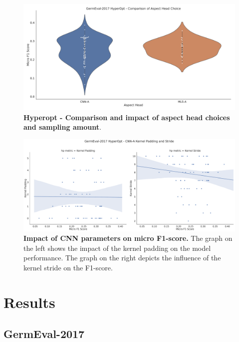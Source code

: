 \begin{figure}[H]
	\centering
	\includegraphics[width=\textwidth]{figures/06_results/06_hp_ge_vio_aspectHead_test}
	\caption{\textbf{Hyperopt - Comparison and impact of aspect head choices and sampling amount}.}
	\label{fig:06_ge_aspectHeadChoices}
\end{figure}

\begin{figure}[H]
	\centering
	\includegraphics[width=\textwidth]{figures/06_results/06_hp_ge_lm_cnnParams2_test}
	\caption{\textbf{Impact of CNN parameters on micro F1-score.} The graph on the left shows the impact of the kernel padding on the model performance. The graph on the right depicts the influence of the kernel stride on the F1-score.}
	\label{fig:06_HpOptim_CnnParams2}
\end{figure}

\section{Results}

\subsection{GermEval-2017}

